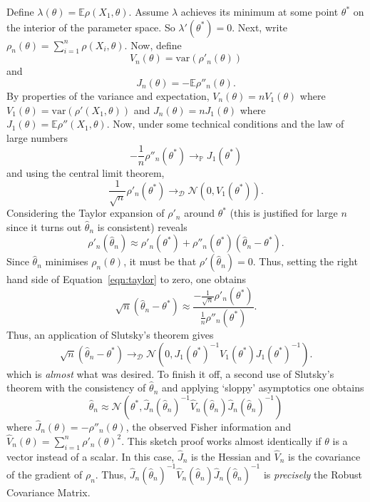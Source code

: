 Define $\lambda(\theta) = \mathbb{E} \rho(X_1, \theta)$. Assume $\lambda$ achieves its minimum at some point $\theta^*$ on the interior of the parameter space. So $\lambda'(\theta^*) = 0$. Next, write $\rho_n(\theta) = \sum_{i=1}^n \rho(X_i, \theta)$. Now, define
\begin{equation}
    V_n(\theta) = \text{var}(\rho'_n(\theta))
\end{equation}
and
\begin{equation}
    J_n(\theta) = -\mathbb{E}\rho''_n(\theta).
\end{equation}
By properties of the variance and expectation, $V_n(\theta) = nV_1(\theta)$ where $V_1(\theta) = \text{var}(\rho'(X_1, \theta))$ and  $J_n(\theta) = nJ_1(\theta)$ where $J_1(\theta) = \mathbb{E}\rho''(X_1, \theta)$. Now, under some technical conditions and the law of large numbers
\begin{equation}
    -\frac{1}{n}\rho''_n(\theta^*) \to_\mathbb{P} J_1(\theta^*)
\end{equation}
and using the central limit theorem,
\begin{equation}
    \frac{1}{\sqrt{n}} \rho'_n(\theta^*) \to_\mathcal{D} \mathcal{N}(0, V_1(\theta^*)).
\end{equation}
Considering the Taylor expansion of $\rho'_n$ around $\theta^*$ (this is justified for large $n$ since it turns out $\hat{\theta}_n$ is consistent) reveals
\begin{equation}
    \label{eqn:taylor}
    \rho'_n(\hat{\theta}_n) \approx \rho'_n(\theta^*) + \rho''_n(\theta^*)(\hat{\theta}_n - \theta^*).
\end{equation}
Since $\hat{\theta}_n$ minimises $\rho_n(\theta)$, it must be that $\rho'(\hat{\theta}_n) = 0$. Thus, setting the right hand side of Equation~\ref{eqn:taylor} to zero, one obtains
\begin{equation}
    \sqrt{n}(\hat{\theta}_n - \theta^*) \approx \frac{-\frac{1}{\sqrt{n}}\rho'_n(\theta^*)}{\frac{1}{n}\rho''_n(\theta^*)}.
\end{equation}
Thus, an application of Slutsky's theorem gives
\begin{equation}
    \sqrt{n}(\hat{\theta}_n - \theta^*) \to_\mathcal{D} \mathcal{N}(0, J_1(\theta^*)^{-1} V_1(\theta^*) J_1(\theta^*)^{-1}).
\end{equation}
which is \emph{almost} what was desired. To finish it off, a second use of Slutsky's theorem with the consistency of $\hat{\theta}_n$ and applying `sloppy' asymptotics one obtains
\begin{equation}
    \hat{\theta}_n \approx \mathcal{N}(\theta^*, \hat{J}_n(\hat{\theta}_n)^{-1} \hat{V}_n(\hat{\theta}_n) \hat{J}_n(\hat{\theta}_n)^{-1})
\end{equation}
where $\hat{J}_n(\theta) = - \rho''_n(\theta)$, the observed Fisher information and $\hat{V}_n(\theta) = \sum_{i=1}^n \rho'_n(\theta)^2$.
This sketch proof works almost identically if $\theta$ is a vector instead of a scalar. In this case, $\hat{J}_n$ is the Hessian and $\hat{V}_n$ is the covariance of the gradient of  $\rho_n$. Thus, $\hat{J}_n(\hat{\theta}_n)^{-1} \hat{V}_n(\hat{\theta}_n) \hat{J}_n(\hat{\theta}_n)^{-1}$ is \emph{precisely} the Robust Covariance Matrix.

